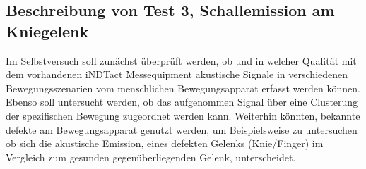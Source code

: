 \documentclass[twoside, 12pt, a4paper]{article}
\begin{document}
\subsection{Beschreibung von Test 3, Schallemission am Kniegelenk}	


Im Selbstversuch soll zun\"achst \"uberpr\"uft werden, ob und in welcher Qualit\"at mit dem vorhandenen iNDTact Messequipment akustische Signale in verschiedenen Bewegungsszenarien vom menschlichen Bewegungsapparat erfasst werden k\"onnen. Ebenso soll untersucht werden, ob das aufgenommen Signal \"uber eine Clusterung der spezifischen Bewegung zugeordnet werden kann. Weiterhin k\"onnten, bekannte defekte am Bewegungsapparat genutzt werden, um Beispielsweise zu untersuchen ob sich die akustische Emission, eines defekten Gelenks (Knie/Finger) im Vergleich zum gesunden gegen\"uberliegenden Gelenk, unterscheidet.




	
	\begin{flushleft}
		
	\end{flushleft}
	
\end{document}
